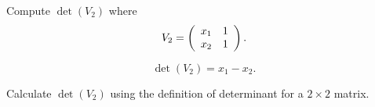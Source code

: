 \documentclass{ximera}
\begin{document}
\begin{exercise} \label{YZ_7.1_Vandermonde_a} 
Compute $\det(V_2)$ where
\[
V_2=\left(\begin{array}{rrrrrrrrrrrrrrrrrr} x_1&1\\ x_2&1 \end{array}\right). 
\]

\begin{solution}
\ans
\[
\det(V_2)=x_1-x_2.
\]

\soln
Calculate $\det(V_2)$ using the definition of determinant for a $2\times 2$ matrix.
\end{solution}
\end{exercise}
\end{document}
